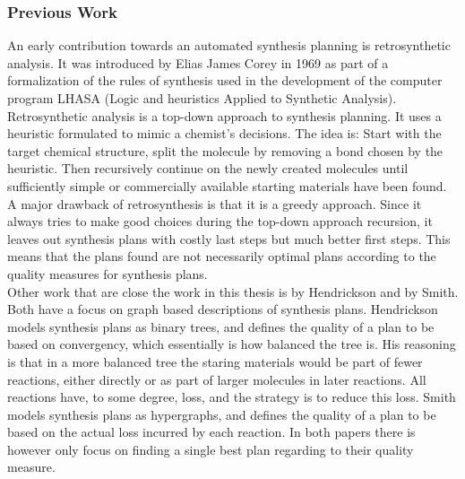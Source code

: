 \documentclass[a4paper,10pt,titlepage]{paper}
\begin{document}
\subsubsection*{Previous Work}
An early contribution towards an automated synthesis planning is retrosynthetic analysis. It was introduced by Elias James Corey in 1969 as part of a formalization of the rules of synthesis used in the development of the computer program LHASA (Logic and heuristics Applied to Synthetic Analysis)\cite{Corey}. Retrosynthetic analysis is a top-down approach to synthesis planning. It uses a heuristic formulated to mimic a chemist's decisions. The idea is: Start with the target chemical structure, split the molecule by removing a bond chosen by the heuristic. Then recursively continue on the newly created molecules until sufficiently simple or commercially available starting materials have been found. A major drawback of retrosynthesis is that it is a greedy approach. Since it always tries to make good choices during the top-down approach recursion, it leaves out synthesis plans with costly last steps but much better first steps. This means that the plans found are not necessarily optimal plans according to the quality measures for synthesis plans.\cite{Fagerberg}\\
Other work that are close the work in this thesis is by Hendrickson \cite{Hendrickson} and by Smith\cite{Smith}. Both have a focus on graph based descriptions of synthesis plans. Hendrickson models synthesis plans as binary trees, and defines the quality of a plan to be based on convergency, which essentially is how balanced the tree is. His reasoning is that in a more balanced tree the staring materials would be part of fewer reactions, either directly or as part of larger molecules in later reactions. All reactions have, to some degree, loss, and the strategy is to reduce this loss. Smith models synthesis plans as hypergraphs, and defines the quality of a plan to be based on the actual loss incurred by each reaction. In both papers there is however only focus on finding a single best plan regarding to their quality measure.\cite{Fagerberg}
\end{document}

